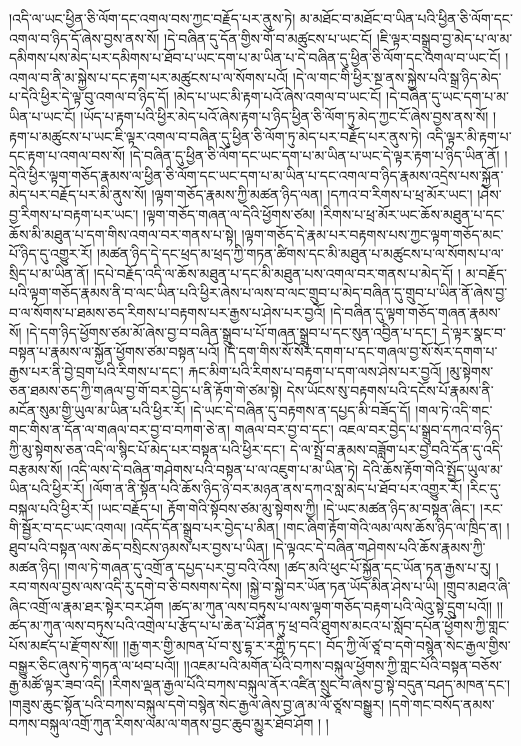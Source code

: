 །འདི་ལ་ཡང་ཕྱིན་ཅི་ལོག་དང་འགལ་བས་ཀྱང་བརྗོད་པར་ནུས་ཏེ། མ་མཐོང་བ་མཐོང་བ་ཡིན་པའི་ཕྱིན་ཅི་ལོག་དང་འགལ་བ་ཉིད་དོ་ཞེས་བྱས་ནས་སོ། །དེ་བཞིན་དུ་དོན་གྱིས་གོ་བ་མཚུངས་པ་ཡང་ངོ། །ཇི་ལྟར་བསྒྲུབ་བྱ་མེད་པ་ལ་མ་དམིགས་པས་མེད་པར་དམིགས་པ་ཐོབ་པ་ཡང་དག་པ་མ་ཡིན་པ་དེ་བཞིན་དུ་ཕྱིན་ཅི་ལོག་དང་འགལ་བ་ཡང་ངོ། །འགལ་བ་ནི་མ་སྐྱེས་པ་དང་རྟག་པར་མཚུངས་པ་ལ་སོགས་པའོ། །དེ་ལ་གང་གི་ཕྱིར་སྔ་ནས་སྐྱེས་པའི་སྒྲ་ཉིད་མེད་པ་དེའི་ཕྱིར་དེ་ལྟ་བུ་འགལ་བ་ཉིད་དོ། །མེད་པ་ཡང་མི་རྟག་པའོ་ཞེས་འགལ་བ་ཡང་ངོ། །དེ་བཞིན་དུ་ཡང་དག་པ་མ་ཡིན་པ་ཡང་ངོ། །ཡོད་པ་རྟག་པའི་ཕྱིར་མེད་པའོ་ཞེས་རྟག་པ་ཉིད་ཕྱིན་ཅི་ལོག་ཏུ་མེད་ཀྱང་ངོ་ཞེས་བྱས་ནས་སོ། །རྟག་པ་མཚུངས་པ་ཡང་ཇི་ལྟར་འགལ་བ་བཞིན་དུ་ཕྱིན་ཅི་ལོག་ཏུ་མེད་པར་བརྗོད་པར་ནུས་ཏེ། འདི་ལྟར་མི་རྟག་པ་དང་རྟག་པ་འགལ་བས་སོ། །དེ་བཞིན་དུ་ཕྱིན་ཅི་ལོག་དང་ཡང་དག་པ་མ་ཡིན་པ་ཡང་དེ་ལྟར་རྟག་པ་ཉིད་ཡིན་ནོ། །དེའི་ཕྱིར་ལྟག་གཅོད་རྣམས་ལ་ཕྱིན་ཅི་ལོག་དང་ཡང་དག་པ་མ་ཡིན་པ་དང་འགལ་བ་ཉིད་རྣམས་འདྲེས་པས་སྐྱོན་མེད་པར་བརྗོད་པར་མི་ནུས་སོ། །ལྟག་གཅོད་རྣམས་ཀྱི་མཚན་ཉིད་ལན། །དཀའ་བ་རིགས་པ་ཕྲ་མོར་ཡང་། །ཤེས་བྱ་རིགས་པ་བརྟག་པར་ཡང་། །ལྟག་གཅོད་གཞན་ལ་དེའི་ཕྱོགས་ཙམ། །རིགས་པ་ཕྲ་མོར་ཡང་ཆོས་མཐུན་པ་དང་ཆོས་མི་མཐུན་པ་དག་གིས་འགལ་བར་གནས་པ་སྟེ། །ལྟག་གཅོད་དེ་རྣམ་པར་བརྟགས་པས་ཀྱང་ལྟག་གཅོད་མང་པོ་ཉིད་དུ་འགྱུར་རོ། །མཚན་ཉིད་དེ་དང་ཕྲད་མ་ཕྲད་ཀྱི་གཏན་ཚིགས་དང་མི་མཐུན་པ་མཚུངས་པ་ལ་སོགས་པ་ལ་སྲིད་པ་མ་ཡིན་ནོ། །དཔེ་བརྗོད་འདི་ལ་ཆོས་མཐུན་པ་དང་མི་མཐུན་པས་འགལ་བར་གནས་པ་མེད་དོ། །
མ་བརྗོད་པའི་ལྟག་གཅོད་རྣམས་ནི་བ་ལང་ཡིན་པའི་ཕྱིར་ཞེས་པ་ལས་བ་ལང་གྲུབ་པ་མེད་བཞིན་དུ་གྲུབ་པ་ཡིན་ནོ་ཞེས་བྱ་བ་ལ་སོགས་པ་ཐམས་ཅད་རིགས་པ་བརྟགས་པར་རྒྱས་པ་ཤེས་པར་བྱའོ། །དེ་བཞིན་དུ་ལྟག་གཅོད་གཞན་རྣམས་སོ། །དེ་དག་ཉིད་ཕྱོགས་ཙམ་མོ་ཞེས་བྱ་བ་བཞིན་སྒྲུབ་པ་པོ་གཞན་སྒྲུབ་པ་དང་སུན་འབྱིན་པ་དང་། དེ་ལྟར་སྣང་བ་བསྟན་པ་རྣམས་ལ་སྐྱོན་ཕྱོགས་ཙམ་བསྟན་པའོ། །དེ་དག་གིས་སོ་སོར་དགག་པ་དང་གཞལ་བྱ་སོ་སོར་དགག་པ་རྒྱས་པར་ནི་བྱེ་བྲག་པའི་རིགས་པ་དང་། རྐང་མིག་པའི་རིགས་པ་བརྟག་པ་དག་ལས་ཤེས་པར་བྱའོ། །མུ་སྟེགས་ཅན་ཐམས་ཅད་ཀྱི་གཞལ་བྱ་གོ་བར་བྱེད་པ་ནི་རྟོག་གེ་ཙམ་སྟེ། དེས་ཡོངས་སུ་བརྟགས་པའི་དངོས་པོ་རྣམས་ནི་མངོན་སུམ་གྱི་ཡུལ་མ་ཡིན་པའི་ཕྱིར་རོ། །དེ་ཡང་དེ་བཞིན་དུ་བརྟགས་ན་དཔྱད་མི་བཟོད་དོ། །གལ་ཏེ་འདི་གང་གང་གིས་ན་དོན་ལ་གཞལ་བར་བྱ་བ་བཀག་ཅེ་ན། གཞལ་བར་བྱ་བ་དང་། འཇལ་བར་བྱེད་པ་སྒྲུབ་དཀའ་བ་ཉིད་ཀྱི་མུ་སྟེགས་ཅན་འདི་ལ་སྙིང་པོ་མེད་པར་བསྟན་པའི་ཕྱིར་དང་། དེ་ལ་སྤྲོ་བ་རྣམས་བཟློག་པར་བྱ་བའི་དོན་དུ་འདི་བརྩམས་སོ། །འདི་ལས་དེ་བཞིན་གཤེགས་པའི་བསྟན་པ་ལ་འཇུག་པ་མ་ཡིན་ཏེ། དེའི་ཆོས་རྟོག་གེའི་སྤྱོད་ཡུལ་མ་ཡིན་པའི་ཕྱིར་རོ། །ལོག་ན་ནི་སྟོན་པའི་ཆོས་ཉིད་ཉེ་བར་མཉན་ནས་དཀའ་སླ་མེད་པ་ཐོབ་པར་འགྱུར་རོ། །རིང་དུ་བསྐལ་པའི་ཕྱིར་རོ། །ཡང་བརྗོད་པ། རྟོག་གེའི་སྟོབས་ཙམ་མུ་སྟེགས་ཀྱི། །དེ་ཡང་མཚན་ཉིད་མ་བསྟན་ཞིང་། །རང་གི་སྦྱོར་བ་དང་ཡང་འགལ། །འདོད་དོན་སྒྲུབ་པར་བྱེད་པ་མིན། །གང་ཞིག་རྟོག་གེའི་ལམ་ལས་ཆོས་ཉིད་ལ་ཁྲིད་ན། །ཐུབ་པའི་བསྟན་ལས་ཆེད་བསྲིངས་ཉམས་པར་བྱས་པ་ཡིན། །དེ་ལྟའང་དེ་བཞིན་གཤེགས་པའི་ཆོས་རྣམས་ཀྱི་མཚན་ཉིད། །གལ་ཏེ་གཞན་དུ་འགྲོ་ན་དཔྱད་པར་བྱ་བའི་འོས། །ཚད་མའི་ཕུང་པོ་སྐྱོན་དང་ཡོན་ཏན་རྒྱས་པ་རུ། །རབ་གསལ་བྱས་ལས་འདི་རུ་དགེ་བ་ཅི་བསགས་དེས། །སྐྱེ་བ་སྐྱེ་བར་ཡོན་ཏན་ཡོད་མིན་ཤེས་པ་ཡི། །གྲུབ་མཐའ་ཞི་ཞིང་འགྲོ་ལ་རྣམ་ཐར་སྟེར་བར་ཤོག །ཚད་མ་ཀུན་ལས་བཏུས་པ་ལས་ལྟག་གཅོད་བརྟག་པའི་ལེའུ་སྟེ་དྲུག་པའོ།། །།ཚད་མ་ཀུན་ལས་བཏུས་པའི་འགྲེལ་པ་རྩོད་པ་པ་ཆེན་པོ་ཤིན་ཏུ་ཕྲ་བའི་ཐུགས་མངའ་པ་སློབ་དཔོན་ཕྱོགས་ཀྱི་གླང་པོས་མཛད་པ་རྫོགས་སོ།། །།རྒྱ་གར་གྱི་མཁན་པོ་བ་སུ་དྷ་ར་རཀྵི་ཏ་དང་། བོད་ཀྱི་ལོ་ཙཱ་བ་དགེ་བསྙེན་སེང་རྒྱལ་གྱིས་བསྒྱུར་ཅིང་ཞུས་ཏེ་གཏན་ལ་ཕབ་པའོ།། །།འཇམ་པའི་མགོན་པོའི་བཀས་བསྐུལ་ཕྱོགས་ཀྱི་གླང་པོའི་བསྟན་བཅོས་རྒྱ་མཚོ་ལྟར་ཟབ་འདི། །རིགས་ལྡན་རྒྱལ་པོའི་བཀས་བསྐུལ་ནོར་འཛིན་སྲུང་བ་ཞེས་བྱ་སྟེ་བདུན་བཤད་མཁན་དང་། །གཟུས་ཆུང་སྟོན་པའི་བཀས་བསྐུལ་དགེ་བསྙེན་སེང་རྒྱལ་ཞེས་བྱ་ཞ་མ་ལོ་ཙཱས་བསྒྱུར། །དགེ་གང་བསོད་ནམས་བཀས་བསྐུལ་འགྲོ་ཀུན་རིགས་ལམ་ལ་གནས་བྱང་ཆུབ་མྱུར་ཐོབ་ཤོག ། །